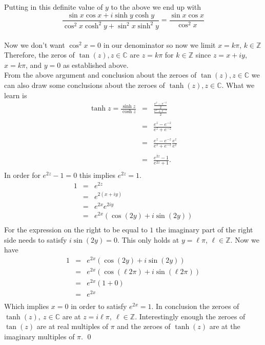 \documentclass[10pt]{amsart}
\theoremstyle{nonumberplain}
\begin{document}
\begin{enumerate}[label={\bf {\arabic*}:}]
Putting in this definite value of $y$ to the above we end up with \\
$$\frac{\sin x \cos x + i \sinh y \cosh y} {\cos^2 x \cosh^2 y  + \sin^2 x \sinh^2 y } = \frac{\sin x \cos x} {\cos^2 x}$$ \\
Now we don't want $\cos^2x = 0$ in our denominator so now we limit $x = k\pi$, $k \in \mathbb{Z}$
Therefore, the zeros of $\tan (z), z \in \mathbb{C}$ are $z = k\pi$ for $k \in \mathbb{Z}$ since $z = x + iy$, $x = k\pi$, and $y = 0$ as established above.\\

\noindent
From the above argument and conclusion about the zeroes of $\tan (z), z \in \mathbb{C}$ we can also draw some conclusions about the zeroes of $\tanh (z), z \in \mathbb{C}$.
What we learn is
\begin{eqnarray*}
\tanh z = \frac{\sinh z}{\cosh z} &=& \frac{\frac{e^z - e^{-z}}{2}}{\frac{e^z + e^{-z}}{2}} \\ \\
 					       &=& \frac{e^z - e^{-z}}{e^z + e^{-z}} \\ \\
					       &=& \frac{e^z - e^{-z}}{e^z + e^{-z}} \frac{e^z}{e^z} \\ \\
					       &=& \frac{e^{2z} -  1}{e^{2z} + 1}. \\
\end{eqnarray*}
In order for $e^{2z} -  1 = 0$ this implies $e^{2z} = 1$.
\begin{eqnarray*}
1 &=& e^{2z} \\
   &=& e^{2(x + iy)} \\
   &=& e^{2x}e^{2iy} \\
   &=& e^{2x}(\cos(2y) + i \sin(2y)) \\
\end{eqnarray*}
For the expression on the right to be equal to $1$ the imaginary part of the right side needs to satisfy $i \sin(2y) = 0$.
This only holds at $y = \ell \pi$, $\ell \in \mathbb{Z}$.
Now we have 
\begin{eqnarray*}
1 &=& e^{2x}(\cos(2y) + i \sin(2y)) \\
   &=& e^{2x}(\cos(\ell 2\pi) + i \sin(\ell 2 \pi)) \\
   &=& e^{2x}(1 + 0) \\
   &=& e^{2x} \\
\end{eqnarray*}
Which implies $x = 0$ in order to satisfy $ e^{2x} = 1$.
In conclusion the zeroes of $\tanh(z), \: z \in \mathbb{C}$ are at $ z = i \ell \pi, \: \ell \in \mathbb{Z}$. Interestingly enough the zeroes of $\tan(z)$ are at real multiples of $\pi$ and the zeroes of $\tanh(z)$ are at the imaginary multiples of $\pi$.
\qed
\\


\end{enumerate}
\end{document}
